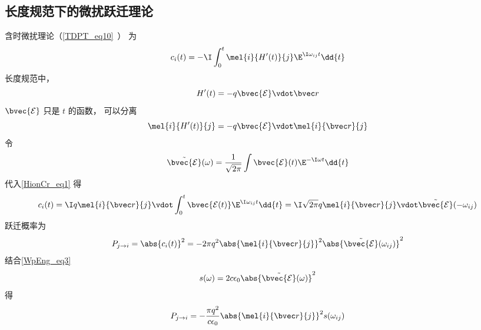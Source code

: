 \subsection{长度规范下的微扰跃迁理论}
含时微扰理论（\autoref{TDPT_eq10}~） 为
\begin{equation}\label{HionCr_eq1}
c_i(t) = -\I \int_0^t \mel{i}{H'(t)}{j} \E^{\I\omega_{ij} t} \dd{t}
\end{equation}
长度规范中，
\begin{equation}
H'(t) = -q\bvec {\mathcal E} \vdot \bvec r
\end{equation}
$\bvec {\mathcal E}$ 只是 $t$ 的函数， 可以分离
\begin{equation}
\mel{i}{H'(t)}{j} = -q\bvec {\mathcal E} \vdot \mel{i}{\bvec r}{j}
\end{equation}
令
\begin{equation}
\tilde {\bvec {\mathcal E}}(\omega) = \frac{1}{\sqrt{2\pi}} \int \bvec {\mathcal E}(t) \E^{-\I\omega t} \dd{t}
\end{equation}
代入\autoref{HionCr_eq1} 得
\begin{equation}
c_i(t) = \I q \mel{i}{\bvec r}{j} \vdot \int_0^t \bvec {\mathcal E(t)} \E^{\I\omega_{ij} t} \dd{t} = \I \sqrt{2\pi} q \mel{i}{\bvec r}{j} \vdot \tilde {\bvec {\mathcal E}}(-\omega_{ij})
\end{equation}
跃迁概率为
\begin{equation}\label{HionCr_eq2}
P_{j\to i} = \abs{c_i(t)}^2 = -2\pi q^2 \abs{\mel{i}{\bvec r}{j}}^2 \abs{\tilde {\bvec {\mathcal E}}(\omega_{ij})}^2
\end{equation}
结合\autoref{WpEng_eq3}~
\begin{equation}
s(\omega) = 2c\epsilon_0 \abs{\tilde {\bvec {\mathcal E}}(\omega)}^2
\end{equation}
得
\begin{equation}
P_{j\to i} = -\frac{\pi q^2}{c\epsilon_0} \abs{\mel{i}{\bvec r}{j}}^2 s(\omega_{ij})
\end{equation}

